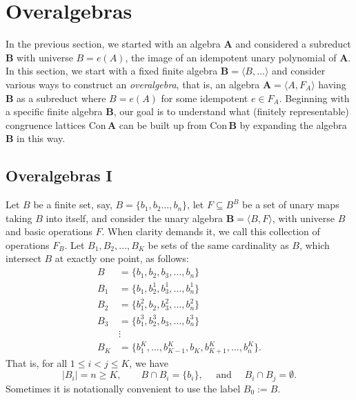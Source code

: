 \documentclass[cm,dissertation,actual,final]{uhthesis}
\theoremstyle{plain}
\theoremstyle{definition}
\theoremstyle{remark}
\numberwithin{theorem}{section}
\numberwithin{claim}{chapter}
\numberwithin{equation}{section}
\numberwithin{conjecture}{chapter}
\newcommand{\<}{\ensuremath{\langle}}
\renewcommand{\>}{\ensuremath{\rangle}}
\renewcommand{\leq}{\ensuremath{\leqslant}}
\renewcommand{\geq}{\ensuremath{\geqslant}}
\newcommand{\Con}{\ensuremath{\mathrm{Con\,}}}
\newcommand{\0}{\ensuremath{\mathbf{0}}}
\newcommand{\1}{\ensuremath{\mathbf{1}}}
\newcommand{\2}{\ensuremath{\mathbf{2}}}
\newcommand{\3}{\ensuremath{\mathbf{3}}}
\newcommand{\4}{\ensuremath{\mathbf{4}}}
\newcommand{\5}{\ensuremath{\mathbf{5}}}
\newcommand{\bA}{\ensuremath{\mathbf{A}}}
\newcommand{\bB}{\ensuremath{\mathbf{B}}}
\begin{document}
\section{Overalgebras}
\label{sec:overalgebras}
In the previous section, we started with an algebra $\bA$ and
considered a subreduct $\bB$ with universe $B = e(A)$, the image of an
idempotent unary polynomial of $\bA$.  In this section, we start with a
fixed finite algebra $\bB = \<B, \dots \>$ and consider various ways to
construct an \emph{overalgebra}, that is, an algebra $\bA= \<A, F_A\>$ having 
$\bB$ as a subreduct where $B = e(A)$ for some idempotent $e \in F_A$.  
Beginning with a specific finite algebra $\bB$, our goal is to understand what
(finitely representable) congruence lattices $\Con\bA$ can be built up from
$\Con\bB$ by expanding the algebra $\bB$ in this way.

\subsection{Overalgebras I}
\label{sec:overalgebras-i}
Let $B$ be a finite set, say, $B = \{b_1, b_2\dots, b_n\}$, let $F\subseteq B^B$
be a set of unary maps taking $B$ into itself, and consider the unary algebra
$\bB = \<B, F\>$, with universe $B$ and basic operations $F$. 
When clarity demands it, we call this collection of operations $F_B$.
Let $B_1, B_2, \dots, B_{K}$ be sets of
the same cardinality as $B$, which intersect $B$ at exactly one point, as follows:
\begin{align}
  \label{eq:OABB}
  B &= \{b_1, b_2, b_3, \dots, b_{n}\}\nonumber\\
  B_1 &= \{b_1, b^1_2,  b^1_3, \dots, b^1_{n}\}\nonumber\\
  B_2 &=  \{b^2_1, b_2,  b^2_3, \dots, b^2_{n}\}\nonumber\\
  B_3 &=  \{b^3_1, b^3_2,  b_3, \dots, b^3_{n}\}\nonumber\\
  & \vdots\\
  B_{K} &= \{b^K_1, \dots, b^K_{K-1},b_K, b^K_{K+1},\dots, b^K_{n}\}.\nonumber
\end{align}
That is, for all $1 \leq i < j \leq K$, we have
\[
|B_i| = n \geq K, \qquad B\cap B_i = \{b_i\}, \quad \text{ and } \quad B_i \cap B_j = \emptyset.
\]
Sometimes it is notationally convenient to use the label $B_0:=B$. %
\end{document}
